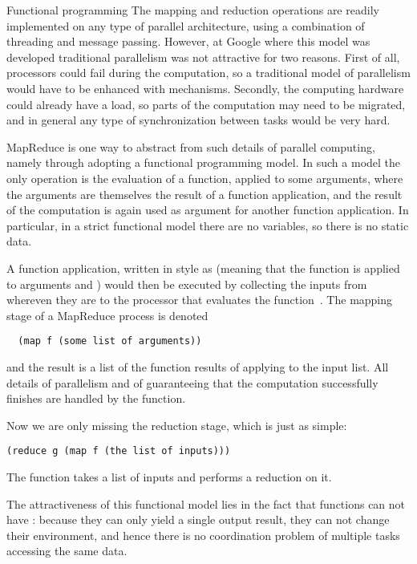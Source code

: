  {Functional programming}
%
The mapping and reduction operations are readily implemented on any
type of parallel architecture, using a combination of threading and
message passing. However, at Google where this model was developed
traditional parallelism was not attractive for two reasons. First of
all, processors could fail during the computation, so a traditional
model of parallelism would have to be enhanced with  mechanisms. Secondly, the computing hardware could
already have a load, so parts of the computation may need to be
migrated, and in general any type of synchronization between tasks
would be very hard.

MapReduce is one way to abstract from such details of parallel
computing, namely through adopting a functional programming model. In
such a model the only operation is the evaluation of a function,
applied to some arguments, where the arguments are themselves the
result of a function application, and the result of the computation is
again used as argument for another function application. In
particular, in a strict functional model there are no variables, so
there is no static data.

A function application, written in  style as  (meaning that the function  is applied to arguments 
and ) would then be executed by collecting the inputs from
whereven they are to the processor that evaluates the
function~. The mapping stage of a MapReduce process is denoted
\begin{verbatim}
  (map f (some list of arguments))
\end{verbatim}
and the result is a list of the function results of applying  to
the input list. All details of parallelism and of guaranteeing that
the computation successfully finishes are handled by the 
function.

Now we are only missing the reduction stage, which is just as simple:
\begin{verbatim}
(reduce g (map f (the list of inputs)))
\end{verbatim}
The  function takes a list of inputs and performs a
reduction on it.

The attractiveness of this functional model lies in the fact that
functions can not have : because they can only
yield a single output result, they can not change
their environment, and hence there is no coordination problem of
multiple tasks accessing the same data. 

